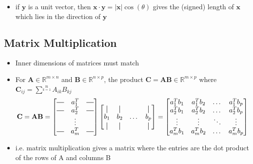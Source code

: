 \documentclass[letterpaper,12pt]{article}
\newcommand{\vect}[1]{\mathbf{#1}}
\newcommand{\matr}[1]{\mathbf{#1}}
\newcommand{\abs}[1]{\lvert#1\rvert}
\newcommand*{\vertbar}{\rule[-1ex]{0.5pt}{2.5ex}} %
\newcommand*{\horzbar}{\rule[.5ex]{2.5ex}{0.5pt}}
\begin{document}
\begin{itemize}
 \item if $\vect{y}$ is a unit vector, then $\vect{x} \cdot \vect{y} = \abs{\vect{x}}\cos(\theta)$ gives the (signed) length of $\vect{x}$ which lies in the direction of $\vect{y}$
\end{itemize}

\subsection{Matrix Multiplication}
\begin{itemize}
 \item Inner dimensions of matrices must match
 \item For $\matr{A} \in \mathbb{R}^{m \times n}$ and $\matr{B} \in \mathbb{R}^{n \times p}$, the product $\matr{C} = \matr{A} \matr{B} \in \mathbb{R}^{m \times p}$ where $\matr{C}_{ij} = \sum\limits^{n}\limits_{k=1} A_{ik}B_{kj}$
       \begin{align}
        \matr{C} = \matr{A}\matr{B} =  \begin{bmatrix}
         \horzbar & a_{1}^{T} & \horzbar \\
         \horzbar & a_{2}^{T} & \horzbar \\
                  & \vdots    &          \\
         \horzbar & a_{m}^{T} & \horzbar
        \end{bmatrix}
        \begin{bmatrix}
         \vertbar & \vertbar &       & \vertbar \\
         b_{1}    & b_{2}    & \dots & b_{p}    \\
         \vertbar & \vertbar &       & \vertbar
        \end{bmatrix}
        =
        \begin{bmatrix}
         a_{1}^{T}b_{1} & a_{1}^{T}b_{2} & \dots  & a_{1}^{T}b_{p} \\
         a_{2}^{T}b_{1} & a_{2}^{T}b_{2} & \dots  & a_{2}^{T}b_{p} \\
         \vdots         & \vdots         & \ddots & \vdots         \\
         a_{m}^{T}b_{1} & a_{m}^{T}b_{2} & \dots  & a_{m}^{T}b_{p}
        \end{bmatrix}
       \end{align}
 \item i.e. matrix multiplication gives a matrix where the entries are the dot product of the rows of A and columns B
\end{itemize}
\end{document}
